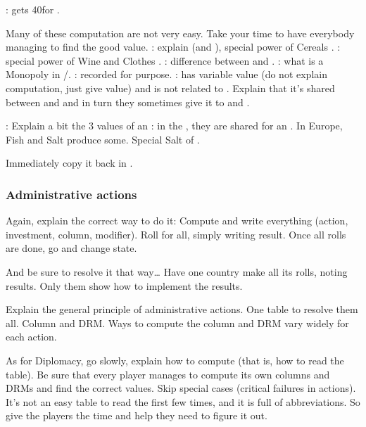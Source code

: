 \bparag {}: \POR gets 40\ducats for
.

 Many of these computation are not very easy. Take your
time to have everybody managing to find the good value.
\bparag {}: explain \DTI (and \FTI),
special power of Cereals \MNU.
\bparag {}: special power of Wine and
Clothes \MNU.
\bparag {}: difference between \STZ and
\CTZ.
\bparag {}: what is a Monopoly in
\STZ/\CTZ.
\bparag {}: recorded for \VPs
purpose.
\bparag {}:  has variable
value (do not explain computation, just give value) and is not related to
\TradeFLEET. Explain that it's shared between \paysEgypte and \paysDamas and
in turn they sometimes give it to \VEN and \TUR.

\bparag {}: Explain a bit the 3 values of an \Area
\bparag {}: in the \ROTW, they are shared for
an \Area. In Europe, Fish and Salt \MNU produce some. Special Salt \MNU of
\VEN.

 Immediately copy it back in .

\subsubsection{Administrative actions}
\aparag Again, explain the correct way to do it:
\bparag Compute and write everything (action, investment, column, modifier).
\bparag Roll for all, simply writing result.
\bparag Once all rolls are done, go and change state.

\aparag And be sure to resolve it that way\ldots
\bparag Have one country make all its rolls, noting results.
\bparag Only them show how to implement the results.

\aparag Explain the general principle of administrative actions.
\bparag One table to resolve them all. Column and DRM.
\bparag Ways to compute the column and DRM vary widely for each action.

\aparag As for Diplomacy, go slowly, explain how to compute (that is, how to
read the table). Be sure that every player manages to compute its own columns
and DRMs and find the correct values.
\bparag Skip special cases (critical failures in \ROTW actions).
\bparag It's not an easy table to read the first few times, and it is full of
abbreviations. So give the players the time and help they need to figure it
out.

